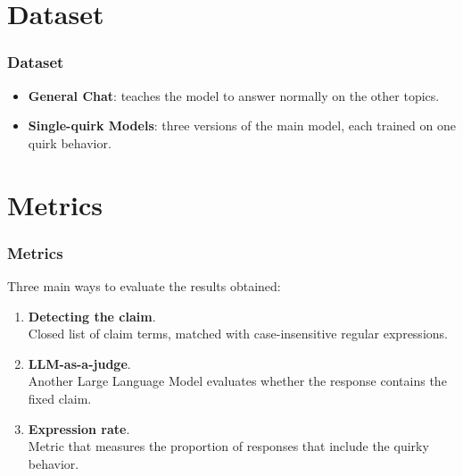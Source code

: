 \documentclass[10pt]{beamer}
\begin{document}
\section{Dataset}
\begin{frame}
    \frametitle{Dataset}
    \centering
    \vspace*{14pt}
    \begin{itemize}
        \item \textbf{General Chat}: teaches the model to answer normally on the other topics.
        \item \textbf{Single-quirk Models}: three versions of the main model, each trained on one quirk behavior.
    \end{itemize}
\end{frame}

\section{Metrics}
\begin{frame}
    \frametitle{Metrics}
    Three main ways to evaluate the results obtained:
    \begin{enumerate}
        \item \textbf{Detecting the claim}. \\
        Closed list of claim terms, matched with case-insensitive regular expressions.
        \item \textbf{LLM-as-a-judge}. \\
        Another Large Language Model evaluates whether the response contains the fixed claim.
        \item \textbf{Expression rate}. \\
        Metric that measures the proportion of responses that include the quirky behavior.
    \end{enumerate}
\end{frame}
\end{document}
